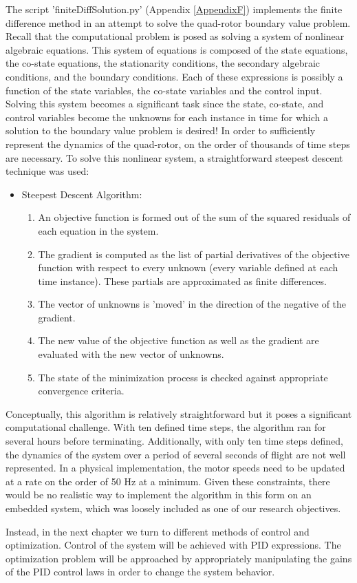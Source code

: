 The script 'finiteDiffSolution.py' (Appendix \ref{AppendixF}) implements the finite difference method in an attempt to solve the quad-rotor boundary value problem. Recall that the computational problem is posed as solving a system of nonlinear algebraic equations. This system of equations is composed of the state equations, the co-state equations, the stationarity conditions, the secondary algebraic conditions, and the boundary conditions. Each of these expressions is possibly a function of the state variables, the co-state variables and the control input. Solving this system becomes a significant task since the state, co-state, and control variables become the unknowns for each instance in time for which a solution to the boundary value problem is desired! In order to sufficiently represent the dynamics of the quad-rotor, on the order of thousands of time steps are necessary. To solve this nonlinear system, a straightforward steepest descent technique was used:


\begin{itemize}
\item Steepest Descent Algorithm:
\begin{enumerate}
    \item{An objective function is formed out of the sum of the squared residuals of each equation in the system.}
    \item{The gradient is computed as the list of partial derivatives of the objective function with respect to every unknown (every variable defined at each time instance). These partials are approximated as finite differences.}
    \item{The vector of unknowns is 'moved' in the direction of the negative of the gradient.}
    \item{The new value of the objective function as well as the gradient are evaluated with the new vector of unknowns. }
    \item{The state of the minimization process is checked against appropriate convergence criteria.}
\end{enumerate}
\end{itemize}


Conceptually, this algorithm is relatively straightforward but it poses a significant computational challenge. With ten defined time steps, the algorithm ran for several hours before terminating. Additionally, with only ten time steps defined, the dynamics of the system over a period of several seconds of flight are not well represented. In a physical implementation, the motor speeds need to be updated at a rate on the order of 50 Hz at a minimum. Given  these constraints, there would be no realistic way to implement the algorithm in this form on an embedded system, which was loosely included as one of our research objectives.

Instead, in the next chapter we turn to different methods of control and optimization. Control of the system will be achieved with PID expressions. The optimization problem will be approached by appropriately manipulating the gains of the PID control laws in order to change the system behavior.








